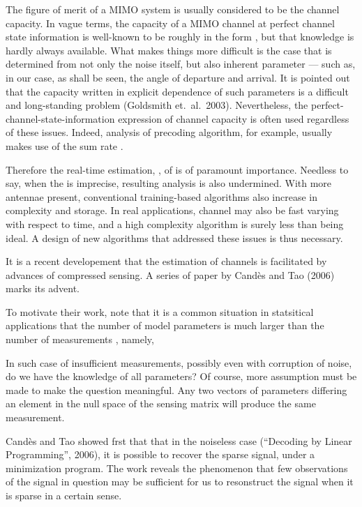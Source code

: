 The figure of merit of a MIMO system is usually considered to be the channel capacity.
In vague terms, the capacity  of a MIMO channel  at perfect channel state information is well-known to be roughly in the form , but that knowledge is hardly always available.
What makes things more difficult is the case that  is determined from not only the noise itself, but also inherent parameter --- such as, in our case, as shall be seen, the angle of departure and arrival.
It is pointed out that the capacity written in explicit dependence of such parameters is a difficult and long-standing problem (Goldsmith et.\ al.\ 2003).
Nevertheless, the perfect-channel-state-information expression of channel capacity is often used regardless of these issues.
Indeed, analysis of precoding algorithm, for example, usually makes use of the sum rate .

Therefore the real-time estimation, , of  is of paramount importance.
Needless to say, when the  is imprecise, resulting analysis is also undermined.
With more antennae present, conventional training-based algorithms also increase in complexity and storage.
In real applications, channel may also be fast varying with respect to time, and a high complexity algorithm is surely less than being ideal.
A design of new algorithms that addressed these issues is thus necessary.

\stopsection
\startsection [title={The Dantzig Selector}]

It is a recent developement that the estimation of channels is facilitated by advances of compressed sensing.
A series of paper by Cand\`es and Tao (2006) marks its advent.

To motivate their work, note that it is a common situation in statsitical applications that the number of model parameters  is much larger than the number of measurements , namely,


In such case of insufficient measurements, possibly even with corruption of noise, do we have the knowledge of all  parameters?
Of course, more assumption must be made to make the question meaningful.
Any two vectors of parameters differing an element in the null space of the sensing matrix will produce the same measurement.

Cand\`es and Tao showed frst that that in the noiseless case (``Decoding by Linear Programming'', 2006), it is possible to recover the sparse signal, under a  minimization program.
The work reveals the phenomenon that few observations of the signal in question may be sufficient for us to resonstruct the signal when it is sparse in a certain sense.

